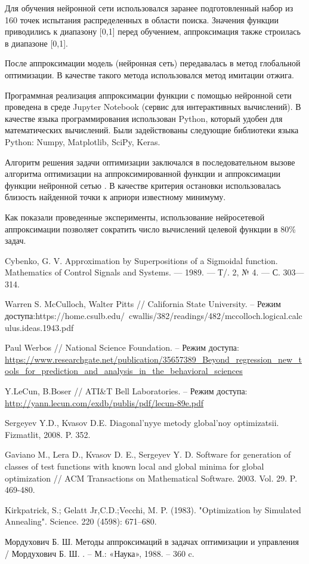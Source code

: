 \documentclass[11pt, oneside, a4paper]{article}
\begin{document}
Для обучения нейронной сети использовался заранее подготовленный набор из 160 точек испытания распределенных в области поиска.
Значения функции приводились к диапазону [0,1] перед обучением, аппроксимация также строилась в диапазоне [0,1].


После аппроксимации модель (нейронная сеть) передавалась в метод глобальной оптимизации.
В качестве такого метода использовался метод имитации отжига\cite{fio_bib7}.


Программная реализация аппроксимации функции с помощью нейронной сети проведена в среде Jupyter Notebook (сервис для интерактивных вычислений). В качестве языка программирования использован Python, который удобен для математических вычислений. Были задействованы следующие библиотеки языка Python: Numpy, Matplotlib, SciPy, Keras.


Алгоритм решения задачи оптимизации заключался в последовательном вызове алгоритма оптимизации на аппроксимированной функции и аппроксимации функции нейронной сетью \cite{fio_bib8}. В качестве критерия остановки использовалась близость найденной точки к априори известному минимуму.

Как показали проведенные эксперименты, использование нейросетевой аппроксимации позволяет сократить число вычислений целевой функции в 80\% задач.



\begin{biblio}

 Cybenko, G. V. Approximation by Superpositions of a Sigmoidal function. Mathematics of Control Signals and Systems. — 1989. — Т/. 2, № 4. — С. 303—314.

 Warren S. McCulloch, Walter Pitts // California State University. – Режим доступа:https://home.csulb.edu/~cwallis/382/readings/482/mccolloch.logical.calculus.ideas.1943.pdf 

 Paul Werbos // National Science Foundation. – Режим доступа: \url{https://www.researchgate.net/publication/35657389_Beyond_regression_new_tools_for_prediction_and_analysis_in_the_behavioral_sciences}

 Y.LeCun, B.Boser // ATI\&T Bell Laboratories. – Режим доступа: \url{http://yann.lecun.com/exdb/publis/pdf/lecun-89e.pdf}

 Sergeyev Y.D., Kvasov D.E. Diagonal'nyye metody global'noy optimizatsii. Fizmatlit, 2008. P. 352.

 Gaviano M., Lera D., Kvasov D. E., Sergeyev Y. D. Software for generation of classes of test functions with known local and global minima for global optimization // ACM Transactions on Mathematical Software. 2003. Vol. 29. P. 469-480.

 Kirkpatrick, S.; Gelatt Jr,C.D.;Vecchi, M. P. (1983). "Optimization by Simulated Annealing". Science. 220 (4598): 671–680.

 Мордухович Б. Ш. Методы аппроксимаций в задачах оптимизации и управления / Мордухович Б. Ш. . – М.: «Наука», 1988. – 360 c.

\end{biblio}

\end{document}
